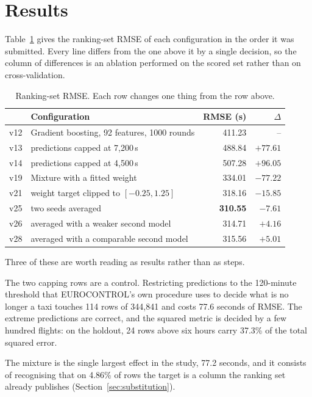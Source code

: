 \documentclass[
  manuscript=article,
  layout=preprint,
  year=2026,
  volume=x,
]{extra/joas}
\begin{document}
\section{Results}
Table~\ref{tb:board} gives the ranking-set RMSE of each configuration in the order it was
submitted. Every line differs from the one above it by a single decision, so the column of
differences is an ablation performed on the scored set rather than on cross-validation.

\begin{table}[htbp!]
  \centering
  \small
  \caption{Ranking-set RMSE. Each row changes one thing from the row above.}
  \label{tb:board}
  \begin{tabular}{llrr}
  \toprule
  & \textbf{Configuration} & \textbf{RMSE (s)} & \textbf{$\Delta$} \\
  \midrule
  v12 & Gradient boosting, 92 features, 1000 rounds & 411.23 & -- \\
  v13 & \quad predictions capped at 7{,}200\,s & 488.84 & $+77.61$ \\
  v14 & \quad predictions capped at 4{,}500\,s & 507.28 & $+96.05$ \\
  v19 & Mixture with a fitted weight & 334.01 & $-77.22$ \\
  v21 & \quad weight target clipped to $[-0.25, 1.25]$ & 318.16 & $-15.85$ \\
  v25 & \quad two seeds averaged & \textbf{310.55} & $-7.61$ \\
  v26 & \quad averaged with a weaker second model & 314.71 & $+4.16$ \\
  v28 & \quad averaged with a comparable second model & 315.56 & $+5.01$ \\
  \bottomrule
  \end{tabular}
\end{table}

Three of these are worth reading as results rather than as steps.

The two capping rows are a control. Restricting predictions to the 120-minute threshold
that EUROCONTROL's own procedure uses to decide what is no longer a taxi touches 114 rows
of 344{,}841 and costs 77.6 seconds of RMSE. The extreme predictions are correct, and the
squared metric is decided by a few hundred flights: on the holdout, 24 rows above six
hours carry 37.3\% of the total squared error.

The mixture is the single largest effect in the study, 77.2 seconds, and it consists of
recognising that on 4.86\% of rows the target is a column the ranking set already
publishes (Section~\ref{sec:substitution}).
\end{document}
